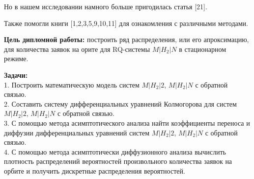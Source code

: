 Но в нашем исследовании намного больше пригодилась статья [21].

Также помогли книги [1,2,3,5,9,10,11] для ознакомления с различными методами.

\textbf{Цель дипломной работы:} построить ряд распределения, или его апроксимацию, для количества заявок на орите для RQ-системы $M|H_2|N$ в стационарном режиме.

\textbf{Задачи:}\\
1. Построить математическую модель систем $M|H_{2}|2$, $M|H_{2}|N$ с обратной связью.\\
2. Составить систему дифференциальных уравнений Колмогорова для систем $M|H_{2}|2$, $M|H_{2}|N$ с обратной связью.\\
3. С помощью метода асимптотического анализа найти коэффициенты переноса и диффузии дифференциальных уравнений систем $M|H_{2}|2$, $M|H_{2}|N$ с обратной связью.\\
4. С помощью метода асимптотически диффузионного анализа вычислить плотность распределений вероятностей произвольного количества заявок на орбите и получить дискретные распределения вероятностей.
